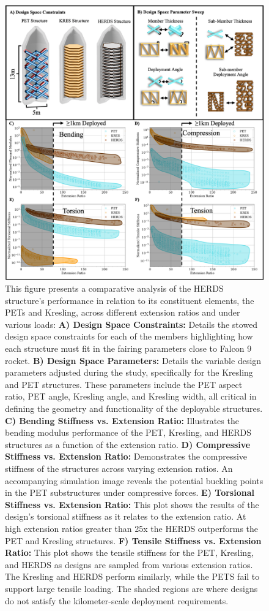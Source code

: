 \begin{figure}
    \centering
    \includegraphics[width=0.65\linewidth]{Figures/Rebuttal/figure4_rebuttal_normalized.png}
    \caption{This figure presents a comparative analysis of the HERDS structure's performance in relation to its constituent elements, the PETs and Kresling, across different extension ratios and under various loads: {\textbf{A) Design Space Constraints:} Details the stowed design space constraints for each of the members highlighting how each structure must fit in the fairing parameters close to Falcon 9 rocket. }\textbf{B) Design Space Parameters:} Details the variable design parameters adjusted during the study, specifically for the Kresling and PET structures. These parameters include the PET aspect ratio, PET angle, Kresling angle, and Kresling width, all critical in defining the geometry and functionality of the deployable structures. \textbf{C) Bending Stiffness vs. Extension Ratio:} Illustrates the bending modulus performance of the PET, Kresling, and HERDS structures as a function of the extension ratio.  \textbf{D) Compressive Stiffness vs. Extension Ratio:} Demonstrates the compressive stiffness of the structures across varying extension ratios. An accompanying simulation image reveals the potential buckling points in the PET substructures under compressive forces. \textbf{E) Torsional Stiffness vs. Extension Ratio:} This plot shows the results of the design's torsional stiffness as it relates to the extension ratio. At high extension ratios greater than 25x the HERDS outperforms the PET and Kresling structures. \textbf{F) Tensile Stiffness vs. Extension Ratio:} This plot shows the tensile stiffness for the PET, Kresling, and HERDS as designs are sampled from various extension ratios. The Kresling and HERDS perform similarly, while the PETS fail to support large tensile loading. {The shaded regions are where designs do not satisfy the kilometer-scale deployment requirements.}}\label{fig:enter-label}
\end{figure}


